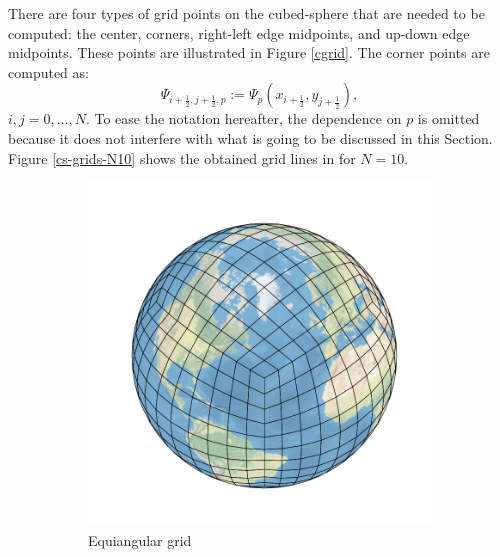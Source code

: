 \documentclass[preprint,12pt]{elsarticle}
\begin{document}
\begin{linenumbers}
There are four types of grid points on the cubed-sphere that are needed to be computed: the center, corners, right-left edge midpoints, and  up-down edge midpoints. 
These points are illustrated in Figure \ref{cgrid}.
The corner points are computed as:
\begin{equation}
	\label{corner-points}
	\Psi_{i+\frac{1}{2},j+\frac{1}{2},p} := {\Psi}_p(x_{i+\frac{1}{2}},y_{j+\frac{1}{2}}),
\end{equation}
$i,j=0, \ldots, N$.
To ease the notation hereafter, the dependence on $p$ is omitted because it does not interfere with what is going to be discussed in this Section.
Figure \ref{cs-grids-N10} shows the obtained grid lines in for $N=10$.
\begin{figure}[!htb]
	\begin{subfigure}{0.42\textwidth}
		\centering
		\includegraphics[width=1.1\linewidth]{gnomonic_equiedge_cs_10_sphere}
		\caption{Equiangular grid}
	\end{subfigure}
	\centering
\begin{subfigure}{0.42\textwidth}
	\centering

\end{subfigure}
\end{figure}
\end{linenumbers}
\end{document}
